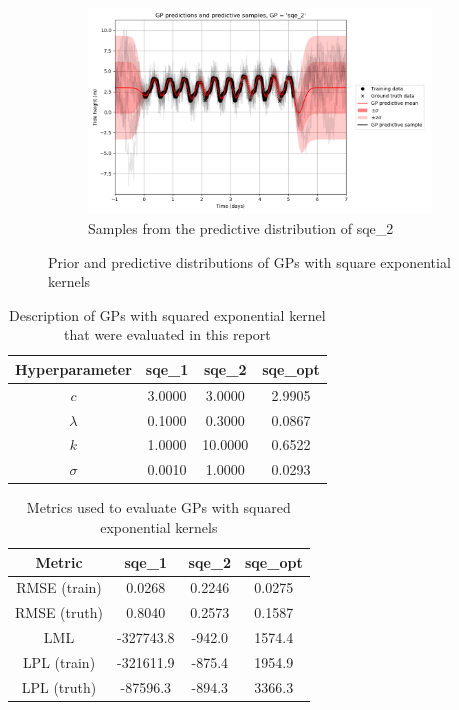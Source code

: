 \documentclass{article}
\begin{document}
\begin{figure}[pht]
\begin{subfigure}{0.45\textwidth}
        \includegraphics[width=\textwidth]{GP_predictions_and_predictive_samples,_GP____sqe_2_.png}
        \caption{Samples from the predictive distribution of sqe\_2}
        \label{fig:pred_samples_sqe_2}
    \end{subfigure}

    \caption{Prior and predictive distributions of GPs with square exponential kernels}
    \label{fig:sqe}
\end{figure}


\begin{table}[ht]
    \centering
    \begin{tabular}{|c|c|c|c|}
        \hline
        Hyperparameter & sqe\_1 & sqe\_2 & sqe\_opt \\
        \hline
        $c$ & 3.0000 & 3.0000 & 2.9905 \\
        $\lambda$ & 0.1000 & 0.3000 & 0.0867 \\
        $k$ & 1.0000 & 10.0000 & 0.6522 \\
        $\sigma$ & 0.0010 & 1.0000 & 0.0293 \\
        \hline
    \end{tabular}
    \caption{Description of GPs with squared exponential kernel that were evaluated in this report}
    \label{table:sqe_details_table}
\end{table}


\begin{table}[ht]
    \centering
    \begin{tabular}{|c|c|c|c|}
        \hline
        Metric & sqe\_1 & sqe\_2 & sqe\_opt \\
        \hline
        RMSE (train) & 0.0268 & 0.2246 & 0.0275 \\
        RMSE (truth) & 0.8040 & 0.2573 & 0.1587 \\
        LML & -327743.8 & -942.0 & 1574.4 \\
        LPL (train) & -321611.9 & -875.4 & 1954.9 \\
        LPL (truth) & -87596.3 & -894.3 & 3366.3 \\
        \hline
    \end{tabular}
    \caption{Metrics used to evaluate GPs with squared exponential kernels}
    \label{table:sqe_metrics_table}
\end{table}
\end{document}
